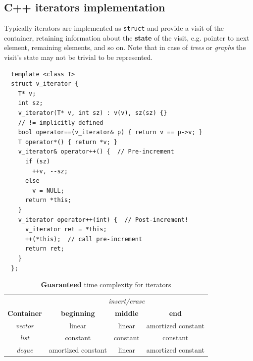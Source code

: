 \subsection{C++ iterators implementation}
Typically iterators are implemented as \lstinline|struct| and provide a visit of the container,
retaining information about the \textbf{state} of the visit, e.g. pointer to next element, remaining elements, and so on.
Note that in case of \textit{trees} or \textit{graphs} the visit's state may not be trivial to be represented.
\begin{lstlisting}
  template <class T>
  struct v_iterator {
    T* v;
    int sz;
    v_iterator(T* v, int sz) : v(v), sz(sz) {}
    // != implicitly defined
    bool operator==(v_iterator& p) { return v == p->v; }
    T operator*() { return *v; }
    v_iterator& operator++() {  // Pre-increment
      if (sz)
        ++v, --sz;
      else
        v = NULL;
      return *this;
    }
    v_iterator operator++(int) {  // Post-increment!
      v_iterator ret = *this;
      ++(*this);  // call pre-increment
      return ret;
    }
  };
\end{lstlisting}

\setlength{\heavyrulewidth}{1.5pt}
\setlength{\abovetopsep}{4pt}
\begin{table}[!htbp]
  \centering
  \begin{tabular}{c|c|c|c}
    \toprule
    & \multicolumn{3}{c}{\textit{insert/erase}}\\
    \textbf{Container} & \textbf{beginning} & \textbf{middle} & \textbf{end} \\
    \midrule
    \textit{vector}  & linear              & linear    & amortized constant\\
    \textit{list}    & constant            & constant  & constant\\
    \textit{deque}   & amortized constant  & linear    & amortized constant\\
    \hline
  \end{tabular}
  \caption{\textbf{Guaranteed} time complexity for iterators}
\end{table}

